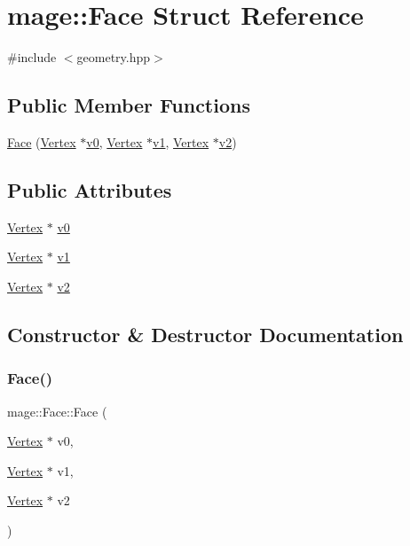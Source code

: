 \hypertarget{structmage_1_1_face}{}\section{mage\+:\+:Face Struct Reference}
\label{structmage_1_1_face}


{\ttfamily \#include $<$geometry.\+hpp$>$}

\subsection*{Public Member Functions}
\begin{DoxyCompactItemize}
\item 
\hyperlink{structmage_1_1_face_a67d33d5e7741cc21d397161f79af19bb}{Face} (\hyperlink{structmage_1_1_vertex}{Vertex} $\ast$\hyperlink{structmage_1_1_face_a8a99c634b7b8dbb37ff3eb70308506dd}{v0}, \hyperlink{structmage_1_1_vertex}{Vertex} $\ast$\hyperlink{structmage_1_1_face_a811aaac2c5e02052763ebdaef4121da0}{v1}, \hyperlink{structmage_1_1_vertex}{Vertex} $\ast$\hyperlink{structmage_1_1_face_a5ad0b031cb4445cef137e1e8b2fa79c8}{v2})
\end{DoxyCompactItemize}
\subsection*{Public Attributes}
\begin{DoxyCompactItemize}
\item 
\hyperlink{structmage_1_1_vertex}{Vertex} $\ast$ \hyperlink{structmage_1_1_face_a8a99c634b7b8dbb37ff3eb70308506dd}{v0}
\item 
\hyperlink{structmage_1_1_vertex}{Vertex} $\ast$ \hyperlink{structmage_1_1_face_a811aaac2c5e02052763ebdaef4121da0}{v1}
\item 
\hyperlink{structmage_1_1_vertex}{Vertex} $\ast$ \hyperlink{structmage_1_1_face_a5ad0b031cb4445cef137e1e8b2fa79c8}{v2}
\end{DoxyCompactItemize}


\subsection{Constructor \& Destructor Documentation}
\hypertarget{structmage_1_1_face_a67d33d5e7741cc21d397161f79af19bb}{}\label{structmage_1_1_face_a67d33d5e7741cc21d397161f79af19bb} 
\subsubsection{\texorpdfstring{Face()}{Face()}}
{\footnotesize\ttfamily mage\+::\+Face\+::\+Face (\begin{DoxyParamCaption}\item[{\hyperlink{structmage_1_1_vertex}{Vertex} $\ast$}]{v0,  }\item[{\hyperlink{structmage_1_1_vertex}{Vertex} $\ast$}]{v1,  }\item[{\hyperlink{structmage_1_1_vertex}{Vertex} $\ast$}]{v2 }\end{DoxyParamCaption})}




